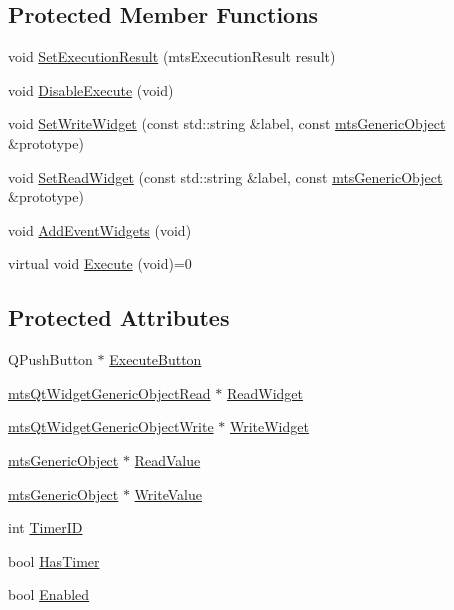 \subsection*{Protected Member Functions}
\begin{DoxyCompactItemize}
\item 
void \hyperlink{classmts_qt_widget_function_a601e9e96839fe89f35a73b0740bd7758}{Set\+Execution\+Result} (mts\+Execution\+Result result)
\item 
void \hyperlink{classmts_qt_widget_function_af7d8ef8071db0595820c6b3646b49d42}{Disable\+Execute} (void)
\item 
void \hyperlink{classmts_qt_widget_function_af41703d3e97486e4ea35b05d831d6168}{Set\+Write\+Widget} (const std\+::string \&label, const \hyperlink{classmts_generic_object}{mts\+Generic\+Object} \&prototype)
\item 
void \hyperlink{classmts_qt_widget_function_a30a3d1b87ecc5594a486ee1cc91023e8}{Set\+Read\+Widget} (const std\+::string \&label, const \hyperlink{classmts_generic_object}{mts\+Generic\+Object} \&prototype)
\item 
void \hyperlink{classmts_qt_widget_function_a302ae69b493245debfcb097bd1f5170e}{Add\+Event\+Widgets} (void)
\item 
virtual void \hyperlink{classmts_qt_widget_function_a2cc4ca75284e81bee8709a70c7b4a231}{Execute} (void)=0
\end{DoxyCompactItemize}
\subsection*{Protected Attributes}
\begin{DoxyCompactItemize}
\item 
Q\+Push\+Button $\ast$ \hyperlink{classmts_qt_widget_function_ade106b082a43dd9521e2d337d6eaed4d}{Execute\+Button}
\item 
\hyperlink{classmts_qt_widget_generic_object_read}{mts\+Qt\+Widget\+Generic\+Object\+Read} $\ast$ \hyperlink{classmts_qt_widget_function_a333d0068c3806b9f53ce88c951b5269b}{Read\+Widget}
\item 
\hyperlink{classmts_qt_widget_generic_object_write}{mts\+Qt\+Widget\+Generic\+Object\+Write} $\ast$ \hyperlink{classmts_qt_widget_function_a4601b0dcc1cdf04274dd9d924e5b49c5}{Write\+Widget}
\item 
\hyperlink{classmts_generic_object}{mts\+Generic\+Object} $\ast$ \hyperlink{classmts_qt_widget_function_a8aaeaa7548a0418ec88d948e01155403}{Read\+Value}
\item 
\hyperlink{classmts_generic_object}{mts\+Generic\+Object} $\ast$ \hyperlink{classmts_qt_widget_function_a0e56b1cd0270cbbbb914602ace6f1586}{Write\+Value}
\item 
int \hyperlink{classmts_qt_widget_function_a9d0fde621a8e282ed207854d6f772a7d}{Timer\+I\+D}
\item 
bool \hyperlink{classmts_qt_widget_function_a0dd74f0d0cec1225c98c06c8ee231b12}{Has\+Timer}
\item 
bool \hyperlink{classmts_qt_widget_function_af20ae57edf9ba7c3404b00eb3fcee728}{Enabled}
\end{DoxyCompactItemize}


